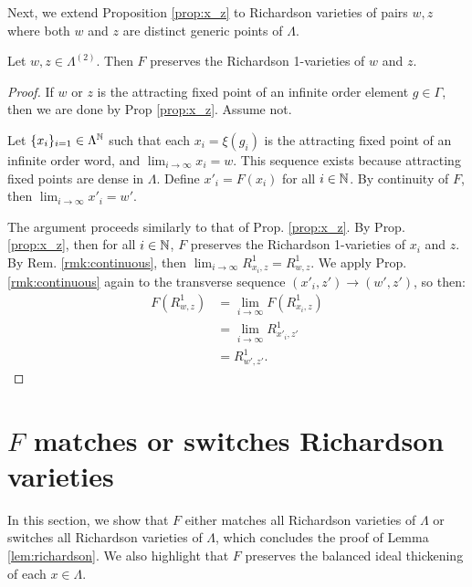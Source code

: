 Next, we extend Proposition \ref{prop:x_z} to Richardson varieties of pairs $w,z$ 
where both $w$ and $z$ are distinct generic points of $\Lambda$.
\begin{proposition}\label{prop:w_z}
    Let $w,z \in \Lambda^{(2)}$.
    Then $F$ preserves the Richardson 1-varieties of $w$ and $z$.
\end{proposition}
\begin{proof}
    If $w$ or $z$ is the attracting fixed point of an infinite order element $g \in \Gamma$, 
    then we are done by Prop \ref{prop:x_z}. Assume not.
    
    Let $\{x_i\}_{i=1} \in \Lambda^{\mathbb{N}}$ such that each $x_i = \xi(g_i)$ is the 
    attracting fixed point of an infinite order word, and $\lim_{i\rightarrow \infty} x_i = w$.
    This sequence exists because attracting fixed points are dense in $\Lambda$.
    Define $x'_i = F(x_i)$ for all $i\in \mathbb{N}$. 
    By continuity of $F$, then $\lim_{i\rightarrow \infty}x'_i = w'$.

    The argument proceeds similarly to that of Prop. \ref{prop:x_z}.
    By Prop. \ref{prop:x_z}, then for all $i \in \mathbb{N}$, 
    $F$ preserves the Richardson 1-varieties of $x_i$ and $z$.
    By Rem. \ref{rmk:continuous}, then $\lim_{i\rightarrow \infty} R^1_{x_i,z} = R^1_{w,z}$.
    We apply Prop. \ref{rmk:continuous} again to the transverse sequence 
    $(x'_i, z') \rightarrow (w',z')$, so then: 
    \begin{align}
        F(R^1_{w,z}) 
        &= \lim_{i\rightarrow \infty} F(R^1_{x_i,z}) \\
        &= \lim_{i\rightarrow \infty} R^1_{x'_i,z'} \\
        &= R^1_{w',z'}.
    \end{align}
\end{proof}

\section{$F$ matches or switches Richardson varieties}

In this section, we show that $F$ either matches all Richardson varieties of $\Lambda$ 
or switches all Richardson varieties of $\Lambda$, 
which concludes the proof of Lemma \ref{lem:richardson}.
We also highlight that $F$ preserves the balanced ideal thickening of each $x \in \Lambda$.

